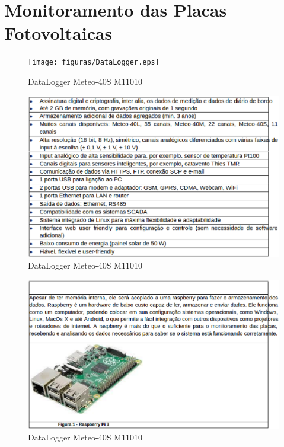 \section{Monitoramento das Placas Fotovoltaicas}

\begin{figure}[!ht]
  \centering
  \texttt{[image: figuras/DataLogger.eps]}
  \caption{DataLogger Meteo-40S M11010}
  \label{fig:datalogger}
\end{figure}

\begin{figure}[!ht]
  \centering
  \includegraphics[keepaspectratio=true,scale=0.5]{figuras/SmartGrid_Monitoramento_placas_fotovotaicas_1.eps}
  \caption{DataLogger Meteo-40S M11010}
  \label{fig:tabela_datalogger_1}
\end{figure}

\begin{figure}[!ht]
  \centering
  \includegraphics[keepaspectratio=true,scale=0.5]{figuras/SmartGrid_Monitoramento_placas_fotovotaicas_2.eps}
  \caption{DataLogger Meteo-40S M11010}
  \label{fig:tabela_datalogger_2}
\end{figure}

